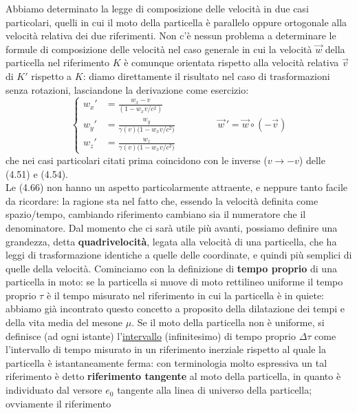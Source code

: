 Abbiamo determinato la legge di composizione delle velocit\`a in due casi
particolari, quelli in cui il moto della particella \`e parallelo oppure
ortogonale alla velocit\`a relativa dei due riferimenti. Non c'\`e nessun
problema a determinare le formule di composizione delle velocit\`a nel caso
generale in cui la velocit\`a $\vec w$ della particella nel riferimento $K$ \`e
comunque orientata rispetto alla velocit\`a relativa $\vec v$ di $K'$ rispetto a
$K$: diamo direttamente il risultato nel caso di trasformazioni senza rotazioni,
lasciandone la derivazione come esercizio:
\begin{equation}
  \left\{\begin{aligned}
    w_x'&=\frac{w_x-v}{(1-w_xv/c^2)}\\
    w_y'&=\frac{w_y}{\gamma(v)\big(1-w_xv/c^2\big)}\\
    w_z'&=\frac{w_z}{\gamma(v)\big(1-w_xv/c^2\big)}
  \end{aligned}\right.
  \qquad\qquad\vec w\,'=\vec w\circ(-\vec v)
  \tag{4.66}
\end{equation}
che nei casi particolari citati prima coincidono con le inverse ($v\to-v$) delle
(4.51) e (4.54).\\
Le (4.66) non hanno un aspetto particolarmente attraente, e neppure tanto facile
da ricordare: la ragione sta nel fatto che, essendo la velocit\`a definita come
spazio/tempo, cambiando riferimento cambiano sia il numeratore che il
denominatore. Dal momento che ci sar\`a utile pi\`u avanti, possiamo definire
una grandezza, detta \textbf{quadrivelocit\`a}, legata alla velocit\`a di una
particella, che ha leggi di trasformazione identiche a quelle delle coordinate,
e quindi pi\`u semplici di quelle della velocit\`a. Cominciamo con la
definizione di \textbf{tempo proprio} di una particella in moto: se la
particella si muove di moto rettilineo uniforme il tempo proprio $\tau$ \`e il
tempo misurato nel riferimento in cui la particella \`e in quiete: abbiamo gi\`a
incontrato questo concetto a proposito della dilatazione dei tempi e della vita
media del mesone $\mu$. Se il moto della particella non \`e uniforme, si
definisce (ad ogni istante) l'\underline{intervallo} (infinitesimo) di tempo
proprio $\Delta\tau$ come l'intervallo di tempo misurato in un riferimento
inerziale rispetto al quale la particella \`e istantaneamente ferma: con
terminologia molto espressiva un tal riferimento \`e detto \textbf{riferimento
tangente} al moto della particella, in quanto \`e individuato dal versore $e_0$
tangente alla linea di universo della particella; ovviamente il riferimento
